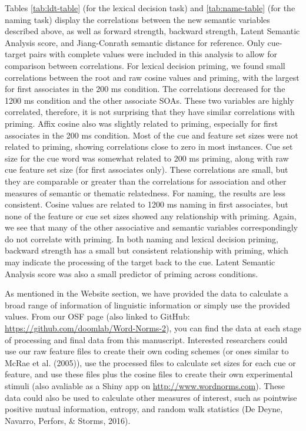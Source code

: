 \documentclass[english,,man]{apa6}
\theoremstyle{definition}
\theoremstyle{definition}
\theoremstyle{definition}
\theoremstyle{remark}
\begin{document}
Tables \ref{tab:ldt-table} (for the lexical decision task) and
\ref{tab:name-table} (for the naming task) display the correlations
between the new semantic variables described above, as well as forward
strength, backward strength, Latent Semantic Analysis score, and
Jiang-Conrath semantic distance for reference. Only cue-target pairs
with complete values were included in this analysis to allow for
comparison between correlations. For lexical decision priming, we found
small correlations between the root and raw cosine values and priming,
with the largest for first associates in the 200 ms condition. The
correlations decreased for the 1200 ms condition and the other associate
SOAs. These two variables are highly correlated, therefore, it is not
surprising that they have similar correlations with priming. Affix
cosine also was slightly related to priming, especially for first
associates in the 200 ms condition. Most of the cue and feature set
sizes were not related to priming, showing correlations close to zero in
most instances. Cue set size for the cue word was somewhat related to
200 ms priming, along with raw cue feature set size (for first
associates only). These correlations are small, but they are comparable
or greater than the correlations for association and other measures of
semantic or thematic relatedness. For naming, the results are less
consistent. Cosine values are related to 1200 ms naming in first
associates, but none of the feature or cue set sizes showed any
relationship with priming. Again, we see that many of the other
associative and semantic variables correspondingly do not correlate with
priming. In both naming and lexical decision priming, backward strength
has a small but consistent relationship with priming, which may indicate
the processing of the target back to the cue. Latent Semantic Analysis
score was also a small predictor of priming across conditions.

As mentioned in the Website section, we have provided the data to
calculate a broad range of information of linguistic information or
simply use the provided values. From our OSF page (also linked to
GitHub: \url{https://github.com/doomlab/Word-Norms-2}), you can find the
data at each stage of processing and final data from this manuscript.
Interested researchers could use our raw feature files to create their
own coding schemes (or ones similar to McRae et al. (2005)), use the
processed files to calculate set sizes for each cue or feature, and use
these files plus the cosine files to create their own experimental
stimuli (also avaliable as a Shiny app on
\url{http://www.wordnorms.com}). These data could also be used to
calculate other measures of interest, such as pointwise positive mutual
information, entropy, and random walk statistics (De Deyne, Navarro,
Perfors, \& Storms, 2016).
\end{document}
